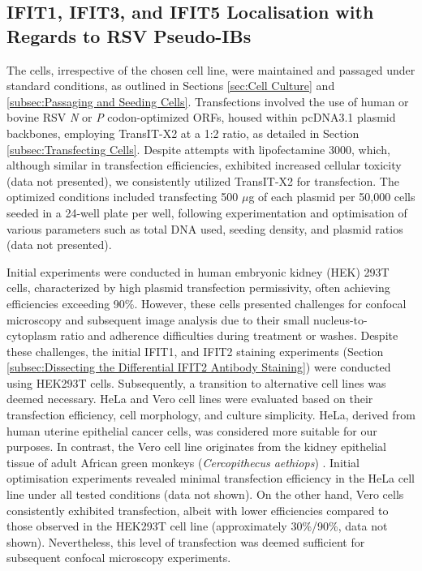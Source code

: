 \subsection{IFIT1, IFIT3, and IFIT5 Localisation with Regards to RSV Pseudo-IBs} \label{subsec:IFIT1, IFIT3, and IFIT5 Localisation with Regards to RSV Pseudo-IBs}
The cells, irrespective of the chosen cell line, were maintained and passaged under standard conditions, as outlined in Sections \ref{sec:Cell Culture} and \ref{subsec:Passaging and Seeding Cells}. Transfections involved the use of human or bovine RSV \textit{N} or \textit{P} codon-optimized ORFs, housed within pcDNA3.1 plasmid backbones, employing TransIT-X2 at a 1:2 ratio, as detailed in Section \ref{subsec:Transfecting Cells}. Despite attempts with lipofectamine 3000, which, although similar in transfection efficiencies, exhibited increased cellular toxicity (data not presented), we consistently utilized TransIT-X2 for transfection. The optimized conditions included transfecting 500 $\mu$g of each plasmid per 50,000 cells seeded in a 24-well plate per well, following experimentation and optimisation of various parameters such as total DNA used, seeding density, and plasmid ratios (data not presented).

Initial experiments were conducted in human embryonic kidney (HEK) 293T cells, characterized by high plasmid transfection permissivity, often achieving efficiencies exceeding 90\%. However, these cells presented challenges for confocal microscopy and subsequent image analysis due to their small nucleus-to-cytoplasm ratio and adherence difficulties during treatment or washes. Despite these challenges, the initial IFIT1, and IFIT2 staining experiments (Section \ref{subsec:Dissecting the Differential IFIT2 Antibody Staining}) were conducted using HEK293T cells. Subsequently, a transition to alternative cell lines was deemed necessary. HeLa and Vero cell lines were evaluated based on their transfection efficiency, cell morphology, and culture simplicity. HeLa, derived from human uterine epithelial cancer cells, was considered more suitable for our purposes. In contrast, the Vero cell line originates from the kidney epithelial tissue of adult African green monkeys (\textit{Cercopithecus aethiops}) \cite{Simizu1967CharacterizationVero}. Initial optimisation experiments revealed minimal transfection efficiency in the HeLa cell line under all tested conditions (data not shown). On the other hand, Vero cells consistently exhibited transfection, albeit with lower efficiencies compared to those observed in the HEK293T cell line (approximately 30\%/90\%, data not shown). Nevertheless, this level of transfection was deemed sufficient for subsequent confocal microscopy experiments.

